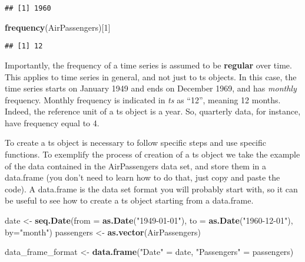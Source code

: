 \documentclass[
]{article}
\newenvironment{Shaded}{\begin{snugshade}}{\end{snugshade}}
\newcommand{\AttributeTok}[1]{\textcolor[rgb]{0.13,0.29,0.53}{#1}}
\newcommand{\DecValTok}[1]{\textcolor[rgb]{0.00,0.00,0.81}{#1}}
\newcommand{\FunctionTok}[1]{\textcolor[rgb]{0.13,0.29,0.53}{\textbf{#1}}}
\newcommand{\NormalTok}[1]{#1}
\newcommand{\OtherTok}[1]{\textcolor[rgb]{0.56,0.35,0.01}{#1}}
\newcommand{\StringTok}[1]{\textcolor[rgb]{0.31,0.60,0.02}{#1}}
\begin{document}
\begin{verbatim}
## [1] 1960
\end{verbatim}

\begin{Shaded}
\begin{Highlighting}[]
\FunctionTok{frequency}\NormalTok{(AirPassengers)[}\DecValTok{1}\NormalTok{]}
\end{Highlighting}
\end{Shaded}

\begin{verbatim}
## [1] 12
\end{verbatim}

Importantly, the frequency of a time series is assumed to be \textbf{regular} over time. This applies to time series in general, and not just to ts objects. In this case, the time series starts on January 1949 and ends on December 1969, and has \emph{monthly} frequency. Monthly frequency is indicated in \emph{ts} as ``12'', meaning 12 months. Indeed, the reference unit of a ts object is a year. So, quarterly data, for instance, have frequency equal to 4.

To create a ts object is necessary to follow specific steps and use specific functions. To exemplify the process of creation of a ts object we take the example of the data contained in the AirPassengers data set, and store them in a data.frame (you don't need to learn how to do that, just copy and paste the code). A data.frame is the data set format you will probably start with, so it can be useful to see how to create a ts object starting from a data.frame.

\begin{Shaded}
\begin{Highlighting}[]
\NormalTok{date }\OtherTok{\textless{}{-}} \FunctionTok{seq.Date}\NormalTok{(}\AttributeTok{from =} \FunctionTok{as.Date}\NormalTok{(}\StringTok{"1949{-}01{-}01"}\NormalTok{), }
                 \AttributeTok{to =} \FunctionTok{as.Date}\NormalTok{(}\StringTok{"1960{-}12{-}01"}\NormalTok{), }\AttributeTok{by=}\StringTok{"month"}\NormalTok{)}
\NormalTok{passengers }\OtherTok{\textless{}{-}} \FunctionTok{as.vector}\NormalTok{(AirPassengers)}

\NormalTok{data\_frame\_format }\OtherTok{\textless{}{-}} \FunctionTok{data.frame}\NormalTok{(}\StringTok{"Date"} \OtherTok{=}\NormalTok{ date, }
                                \StringTok{"Passengers"} \OtherTok{=}\NormalTok{ passengers)}
\end{Highlighting}
\end{Shaded}
\end{document}
